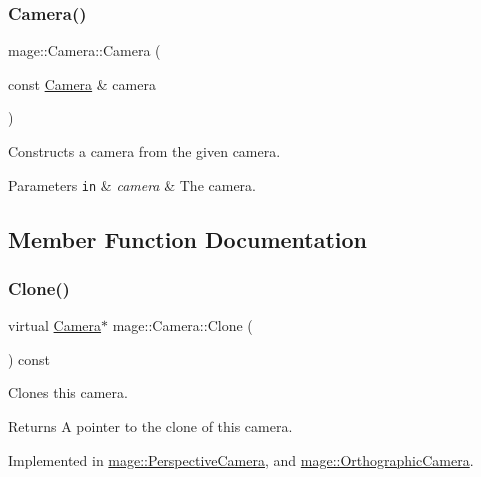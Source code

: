 \subsubsection{\texorpdfstring{Camera()}{Camera()}\hspace{0.1cm}{\footnotesize\ttfamily [2/2]}}
{\footnotesize\ttfamily mage\+::\+Camera\+::\+Camera (\begin{DoxyParamCaption}\item[{const \hyperlink{classmage_1_1_camera}{Camera} \&}]{camera }\end{DoxyParamCaption})\hspace{0.3cm}{\ttfamily [protected]}}

Constructs a camera from the given camera.


\begin{DoxyParams}[1]{Parameters}
\mbox{\tt in}  & {\em camera} & The camera. \\
\hline
\end{DoxyParams}


\subsection{Member Function Documentation}
\hypertarget{classmage_1_1_camera_a19301c2256c183db50b5e9406f7b5f3c}{}\label{classmage_1_1_camera_a19301c2256c183db50b5e9406f7b5f3c} 
\subsubsection{\texorpdfstring{Clone()}{Clone()}}
{\footnotesize\ttfamily virtual \hyperlink{classmage_1_1_camera}{Camera}$\ast$ mage\+::\+Camera\+::\+Clone (\begin{DoxyParamCaption}{ }\end{DoxyParamCaption}) const\hspace{0.3cm}{\ttfamily [pure virtual]}}

Clones this camera.

\begin{DoxyReturn}{Returns}
A pointer to the clone of this camera. 
\end{DoxyReturn}


Implemented in \hyperlink{classmage_1_1_perspective_camera_aa2fae7b2ca5daadeda0fd935fcdb101a}{mage\+::\+Perspective\+Camera}, and \hyperlink{classmage_1_1_orthographic_camera_a3fc2e5cfe7283670937de2a4841a5428}{mage\+::\+Orthographic\+Camera}.

